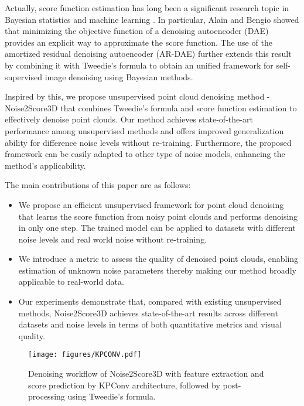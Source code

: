 Actually, score function estimation has long been a significant research topic in Bayesian statistics and machine learning \cite{hyvarinen2005estimation, vincent2011connection, alain2014regularized}. In particular, Alain and Bengio \cite{alain2014regularized} showed that minimizing the objective function of a denoising autoencoder (DAE) provides an explicit way to approximate the score function. The use of the amortized residual denoising autoencoder (AR-DAE)\cite{lim2020ar-dae} further extends this result by combining it with Tweedie's formula to obtain an unified framework for self-supervised image denoising using Bayesian methods.

Inspired by this, we propose unsupervised point cloud denoising method - Noise2Score3D that combines Tweedie's formula and score function estimation to effectively denoise point clouds. Our method achieves state-of-the-art performance among unsupervised methods and offers improved generalization ability for difference noise levels without re-training. Furthermore, the proposed framework can be easily adapted to other type of noise models, enhancing the method's applicability.

The main contributions of this paper are as follows:
\begin{itemize}
\item We propose an efficient unsupervised framework for point cloud denoising that learns the score function from noisy point clouds and performs denoising in only one step. The trained model can be applied to datasets with different noise levels and real world noise without re-training.
\item We introduce a metric to assess the quality of denoised point clouds, enabling estimation of unknown noise parameters thereby making our method broadly applicable to real-world data.
\item Our experiments demonstrate that, compared with existing unsupervised methods, Noise2Score3D achieves state-of-the-art results across different datasets and noise levels in terms of both quantitative metrics and visual quality.
\end{itemize}

\begin{figure*}
  \centering
    \texttt{[image: figures/KPCONV.pdf]}

  \caption{Denoising workflow of Noise2Score3D with feature extraction and score prediction by KPConv architecture, followed by post-processing using Tweedie's formula.}
  \label{fig:kpconv}
\end{figure*}
